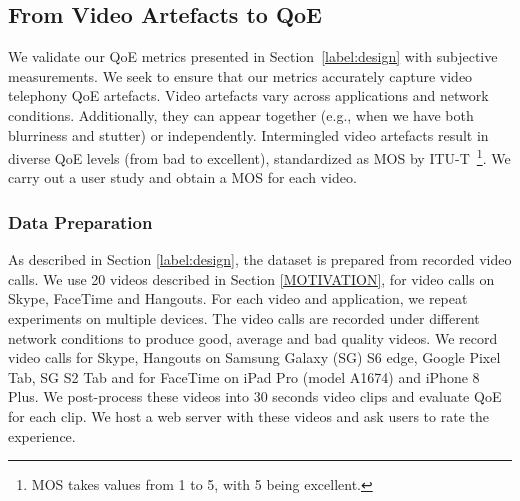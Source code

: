 \subsection{From Video Artefacts to Q\lowercase{o}E} \label{label:results}
We validate our QoE metrics presented in Section~\ref{label:design} with subjective measurements. We seek to ensure that our metrics accurately capture  video telephony QoE artefacts. Video artefacts vary across applications and network conditions. Additionally, they can appear together (e.g., when we have both blurriness and stutter) or independently. Intermingled video artefacts result in diverse QoE levels (from bad to excellent), standardized as MOS by ITU-T~\cite{series2012methodology}\footnote{MOS takes values from 1 to 5, with 5 being excellent.}. We carry out a user study and obtain a MOS for each video.

\subsubsection{Data Preparation}
As described in Section \ref{label:design}, the dataset is prepared from recorded video calls. We use 20 videos described in Section \ref{MOTIVATION}, for video calls on Skype, FaceTime and Hangouts. For each video and application, we repeat  experiments on  multiple devices. The video calls are recorded under different network conditions to produce good, average and bad quality videos. We record video calls for Skype, Hangouts on Samsung Galaxy (SG) S6 edge, Google Pixel Tab, SG S2 Tab and for FaceTime on iPad Pro (model A1674) and iPhone 8 Plus. We post-process these videos into 30 seconds  video clips and evaluate QoE for each clip. We host a web server with these videos and ask users to rate the experience. 

